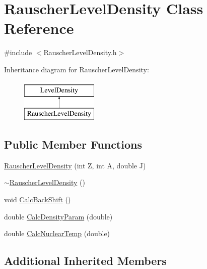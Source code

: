 \hypertarget{classRauscherLevelDensity}{\section{Rauscher\-Level\-Density Class Reference}
\label{classRauscherLevelDensity}
}


{\ttfamily \#include $<$Rauscher\-Level\-Density.\-h$>$}

Inheritance diagram for Rauscher\-Level\-Density\-:\begin{figure}[H]
\begin{center}
\leavevmode
\includegraphics[height=2.000000cm]{dc/da8/classRauscherLevelDensity}
\end{center}
\end{figure}
\subsection*{Public Member Functions}
\begin{DoxyCompactItemize}
\item 
\hyperlink{classRauscherLevelDensity_a714feef52e449a86e2cf2ad23987a4a7}{Rauscher\-Level\-Density} (int Z, int A, double J)
\item 
\hyperlink{classRauscherLevelDensity_a796c7feb9d6c890d01b46f445238f9d6}{$\sim$\-Rauscher\-Level\-Density} ()
\item 
void \hyperlink{classRauscherLevelDensity_af5ce4f61ab69164ea0e8e47a4ed688c4}{Calc\-Back\-Shift} ()
\item 
double \hyperlink{classRauscherLevelDensity_a842444681f72b30d3dfbdf18ba95b207}{Calc\-Density\-Param} (double)
\item 
double \hyperlink{classRauscherLevelDensity_a734ed056ae869367c1cf295503c9d6aa}{Calc\-Nuclear\-Temp} (double)
\end{DoxyCompactItemize}
\subsection*{Additional Inherited Members}


